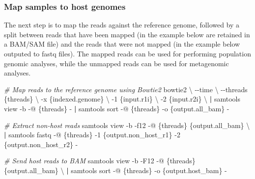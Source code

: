 \documentclass[
]{book}
\newenvironment{Shaded}{\begin{snugshade}}{\end{snugshade}}
\newcommand{\AttributeTok}[1]{\textcolor[rgb]{0.13,0.29,0.53}{#1}}
\newcommand{\CommentTok}[1]{\textcolor[rgb]{0.56,0.35,0.01}{\textit{#1}}}
\newcommand{\DataTypeTok}[1]{\textcolor[rgb]{0.13,0.29,0.53}{#1}}
\newcommand{\ExtensionTok}[1]{#1}
\newcommand{\KeywordTok}[1]{\textcolor[rgb]{0.13,0.29,0.53}{\textbf{#1}}}
\newcommand{\NormalTok}[1]{#1}
\begin{document}
\normalsize

\hypertarget{map-samples-to-host-genomes}{%
\subsubsection*{Map samples to host genomes}\label{map-samples-to-host-genomes}}

The next step is to map the reads against the reference genome, followed by a split between reads that have been mapped (in the example below are retained in a BAM/SAM file) and the reads that were not mapped (in the example below outputed to fastq files). The mapped reads can be used for performing population genomic analyses, while the unmapped reads can be used for metagenomic analyses.

\small

\begin{Shaded}
\begin{Highlighting}[]
\CommentTok{\# Map reads to the reference genome using Bowtie2}
\ExtensionTok{bowtie2} \DataTypeTok{\textbackslash{}}
    \AttributeTok{{-}{-}time} \DataTypeTok{\textbackslash{}}
    \AttributeTok{{-}{-}threads}\NormalTok{ \{threads\} }\DataTypeTok{\textbackslash{}}
    \AttributeTok{{-}x}\NormalTok{ \{indexed.genome\} }\DataTypeTok{\textbackslash{}}
    \AttributeTok{{-}1}\NormalTok{ \{input.r1i\} }\DataTypeTok{\textbackslash{}}
    \AttributeTok{{-}2}\NormalTok{ \{input.r2i\} }\DataTypeTok{\textbackslash{}}
\KeywordTok{|} \ExtensionTok{samtools}\NormalTok{ view }\AttributeTok{{-}b} \AttributeTok{{-}@}\NormalTok{ \{threads\} }\AttributeTok{{-}} \KeywordTok{|} \ExtensionTok{samtools}\NormalTok{ sort }\AttributeTok{{-}@}\NormalTok{ \{threads\} }\AttributeTok{{-}o}\NormalTok{ \{output.all\_bam\} }\AttributeTok{{-}}

\CommentTok{\# Extract non{-}host reads}
\ExtensionTok{samtools}\NormalTok{ view }\AttributeTok{{-}b} \AttributeTok{{-}f12} \AttributeTok{{-}@}\NormalTok{ \{threads\} \{output.all\_bam\} }\DataTypeTok{\textbackslash{}}
\KeywordTok{|} \ExtensionTok{samtools}\NormalTok{ fastq }\AttributeTok{{-}@}\NormalTok{ \{threads\} }\AttributeTok{{-}1}\NormalTok{ \{output.non\_host\_r1\} }\AttributeTok{{-}2}\NormalTok{ \{output.non\_host\_r2\} }\AttributeTok{{-}}

\CommentTok{\# Send host reads to BAM}
\ExtensionTok{samtools}\NormalTok{ view }\AttributeTok{{-}b} \AttributeTok{{-}F12} \AttributeTok{{-}@}\NormalTok{ \{threads\} \{output.all\_bam\} }\DataTypeTok{\textbackslash{}}
\KeywordTok{|} \ExtensionTok{samtools}\NormalTok{ sort }\AttributeTok{{-}@}\NormalTok{ \{threads\} }\AttributeTok{{-}o}\NormalTok{ \{output.host\_bam\} }\AttributeTok{{-}}
\end{Highlighting}
\end{Shaded}
\end{document}
